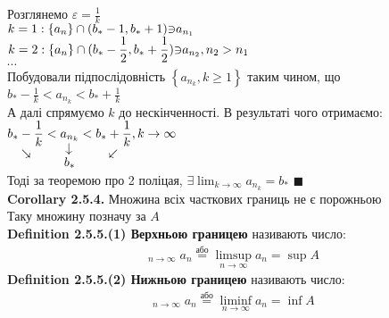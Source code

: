 \documentclass[a4paper, 14pt]{extarticle}
\DeclareMathOperator*\uplim{\overline{lim}}
\DeclareMathOperator*\downlim{\underline{lim}}
\def\bigline{\vspace{5mm}\\}
\def\bigline{\vspace{5mm}\\}
\def\qed{$\blacksquare$}
\def\subsequence#1{$\displaystyle \left\{ {#1}, k\geq1 \right\}$}
\begin{document}
	Розглянемо $\varepsilon = \displaystyle \frac{1}{k}$\\
	$\displaystyle k = 1: \{a_n\}\cap(b_*-1, b_*+1) \rotatebox[origin=c]{180}{$\in$}a_{n_1}$\\
	$\displaystyle k = 2: \{a_n\}\cap(b_*-\frac{1}{2}, b_*+\frac{1}{2}) \rotatebox[origin=c]{180}{$\in$}a_{n_2}, n_2>n_1$\\
	$\cdots$\\
	Побудовали підпослідовність \subsequence{a_{n_k}} таким чином, що\\ $\displaystyle b_*-\frac{1}{k} < a_{n_k} < b_*+\frac{1}{k}$\\
	А далі спрямуємо $k$ до нескінченності. В результаті чого отримаємо:\\
	$\displaystyle \underset{\rotatebox[origin=c]{-45}{$\rightarrow$}}{b_*-\frac{1}{k}} < \underset{\underset{\displaystyle b_*}{\rotatebox[origin=c]{90}{$\leftarrow$}}}{a_{n_k}} < \underset{\rotatebox[origin=c]{45}{$\leftarrow$}}{b_*+\frac{1}{k}}, k \to \infty$\\
	Тоді за теоремою про 2 поліцая, $\displaystyle \exists \lim_{k \to \infty} a_{n_k} = b_*$ \qed
	\bigline
	\textbf{Corollary 2.5.4.} Множина всіх часткових границь не є порожньою\\
	Таку множину позначу за $A$
	\bigline
	\textbf{Definition 2.5.5.(1) Верхньою границею} називають число:
	\begin{align*}
	\displaystyle \uplim_{n \to \infty} a_n \overset{\textrm{або}}{=} \limsup_{n \to \infty} a_n = \sup A
	\end{align*}
	\textbf{Definition 2.5.5.(2) Нижньою границею} називають число:
	\begin{align*}
	\displaystyle \downlim_{n \to \infty} a_n \overset{\textrm{або}}{=} \liminf_{n \to \infty} a_n = \inf A
	\end{align*}
	\bigline
	
\end{document}

